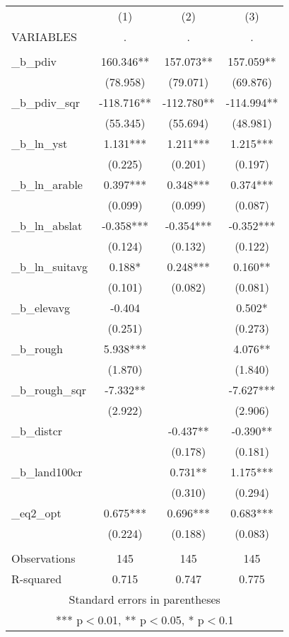\documentclass[]{article}
\begin{document}
\begin{tabular}{lccc} \hline
 & (1) & (2) & (3) \\
VARIABLES & . & . & . \\ \hline
 &  &  &  \\
\_b\_pdiv & 160.346** & 157.073** & 157.059** \\
 & (78.958) & (79.071) & (69.876) \\
\_b\_pdiv\_sqr & -118.716** & -112.780** & -114.994** \\
 & (55.345) & (55.694) & (48.981) \\
\_b\_ln\_yst & 1.131*** & 1.211*** & 1.215*** \\
 & (0.225) & (0.201) & (0.197) \\
\_b\_ln\_arable & 0.397*** & 0.348*** & 0.374*** \\
 & (0.099) & (0.099) & (0.087) \\
\_b\_ln\_abslat & -0.358*** & -0.354*** & -0.352*** \\
 & (0.124) & (0.132) & (0.122) \\
\_b\_ln\_suitavg & 0.188* & 0.248*** & 0.160** \\
 & (0.101) & (0.082) & (0.081) \\
\_b\_elevavg & -0.404 &  & 0.502* \\
 & (0.251) &  & (0.273) \\
\_b\_rough & 5.938*** &  & 4.076** \\
 & (1.870) &  & (1.840) \\
\_b\_rough\_sqr & -7.332** &  & -7.627*** \\
 & (2.922) &  & (2.906) \\
\_b\_distcr &  & -0.437** & -0.390** \\
 &  & (0.178) & (0.181) \\
\_b\_land100cr &  & 0.731** & 1.175*** \\
 &  & (0.310) & (0.294) \\
\_eq2\_opt & 0.675*** & 0.696*** & 0.683*** \\
 & (0.224) & (0.188) & (0.083) \\
 &  &  &  \\
Observations & 145 & 145 & 145 \\
 R-squared & 0.715 & 0.747 & 0.775 \\ \hline
\multicolumn{4}{c}{ Standard errors in parentheses} \\
\multicolumn{4}{c}{ *** p$<$0.01, ** p$<$0.05, * p$<$0.1} \\
\end{tabular}
\end{document}
